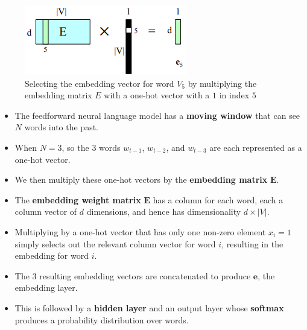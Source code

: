 \begin{table}[H]
    \begin{minipage}{0.45\linewidth}
        \begin{figure}[H]
            \includegraphics[width=\linewidth]{Pictures/nlp/fig-7-16.png}
            \caption{Selecting the embedding vector for word $V_5$ by multiplying the embedding matrix $E$ with a one-hot vector with a $1$ in index $5$}
        \end{figure}
    \end{minipage}
    \hfill
    \begin{minipage}{0.65\linewidth}
        \begin{itemize}
            \item The feedforward neural language model has a \textbf{moving window} that can see $N$ words into the past.

            \item When $N=3$, so the $3$ words $w_{t-1}$, $w_{t-2}$, and $w_{t-3}$ are each represented as a one-hot vector.

            \item We then multiply these one-hot vectors by the \textbf{embedding matrix}  $\mathbf{E}$.

            \item The \textbf{embedding weight matrix} $\mathbf{E}$ has a column for each word, each a column vector of $d$ dimensions, and hence has dimensionality $d \times |V|$. 
            
            \item Multiplying by a one-hot vector that has only one non-zero element $x_i = 1$ simply selects out the relevant column vector for word $i$, resulting in the embedding for word $i$.

            \item The 3 resulting embedding vectors are concatenated to produce $\mathbf{e}$, the embedding layer. 
            
            \item This is followed by a \textbf{hidden layer} and an output layer whose \textbf{softmax} produces a probability distribution over words.
        \end{itemize}
    \end{minipage}
\end{table}
